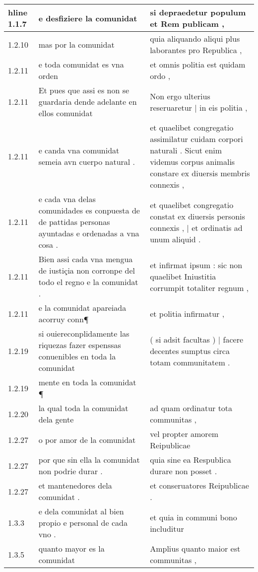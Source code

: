 \begin{tabular}{|p{1cm}|p{6.5cm}|p{6.5cm}|}

\\hline
1.1.7 & e desfiziere la comunidat & si depraedetur populum et Rem publicam , \\\hline
1.2.10 & mas por la comunidat & quia aliquando aliqui plus laborantes pro Republica , \\\hline
1.2.11 & e toda comunidat es vna orden & et omnis politia est quidam ordo , \\\hline
1.2.11 & Et pues que assi es non se guardaria dende adelante en ellos comunidat & Non ergo ulterius reseruaretur | in eis politia , \\\hline
1.2.11 & e canda vna comunidat semeia avn cuerpo natural . & et quaelibet congregatio assimilatur cuidam corpori naturali . Sicut enim videmus corpus animalis constare ex diuersis membris connexis , \\\hline
1.2.11 & e cada vna delas comunidades es conpuesta de de pattidas personas ayuntadas e ordenadas a vna cosa . & et quaelibet congregatio constat ex diuersis personis connexis , | et ordinatis ad unum aliquid . \\\hline
1.2.11 & Bien assi cada vna mengua de iustiçia non corronpe del todo el regno e la comunidat . & et infirmat ipsum : sic non quaelibet Iniustitia corrumpit totaliter regnum , \\\hline
1.2.11 & e la comunidat apareiada acorruy conn¶ & et politia infirmatur , \\\hline
1.2.19 & si ouiereconplidamente las riquezas fazer espenssas conuenibles en toda la comunidat & ( si adsit facultas ) | facere decentes sumptus circa totam communitatem . \\\hline
1.2.19 & mente en toda la comunidat ¶ &  \\\hline
1.2.20 & la qual toda la comunidat dela gente & ad quam ordinatur tota communitas , \\\hline
1.2.27 & o por amor de la comunidat & vel propter amorem Reipublicae \\\hline
1.2.27 & por que sin ella la comunidat non podrie durar . & quia sine ea Respublica durare non posset . \\\hline
1.2.27 & et mantenedores dela comunidat . & et conseruatores Reipublicae . \\\hline
1.3.3 & e dela comunidat al bien propio e personal de cada vno . & et quia in communi bono includitur \\\hline
1.3.5 & quanto mayor es la comunidat & Amplius quanto maior est communitas , \\\hline

\end{tabular}
